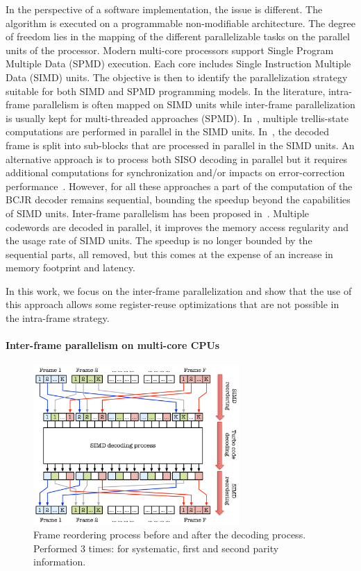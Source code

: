 In the perspective of a software implementation, the issue is different. The
algorithm is executed on a programmable non-modifiable architecture. The degree
of freedom lies in the mapping of the different parallelizable tasks on the
parallel units of the processor. Modern multi-core processors support Single
Program Multiple Data (SPMD) execution. Each core includes Single Instruction
Multiple Data (SIMD) units. The objective is then to identify the
parallelization strategy suitable for both SIMD and SPMD programming models.
In the literature, intra-frame parallelism is often mapped on SIMD units while
inter-frame parallelization is usually kept for multi-threaded approaches
(SPMD). In~\cite{Zhang2012,Wu2013}, multiple trellis-state computations are
performed in parallel in the SIMD units. In~\cite{Wu2010,Wu2011,Chinnici2012,
Yoge2012,Zhang2012,Liu2013,Chen2013,Xianjun2013,Wu2013,Zhang2014,Li2014}, the
decoded frame is split into sub-blocks that are processed in parallel in the
SIMD units. An alternative approach is to process both SISO decoding in parallel
but it requires additional computations for synchronization and/or impacts on
error-correction performance~\cite{Muller2009}. However, for all these
approaches a part of the computation of the BCJR decoder remains sequential,
bounding the speedup beyond the capabilities of SIMD units. Inter-frame
parallelism has been proposed in~\cite{Wu2010,Wu2011,Zhang2012,Wu2013}. Multiple
codewords are decoded in parallel, it improves the memory access regularity and
the usage rate of SIMD units. The speedup is no longer bounded by the sequential
parts, all removed, but this comes at the expense of an increase in memory
footprint and latency.

In this work, we focus on the inter-frame parallelization and show that the use
of this approach allows some register-reuse optimizations that are not possible
in the intra-frame strategy.

\paragraph{Inter-frame parallelism on multi-core CPUs}

\begin{figure}
  \centering
  \includegraphics[width=0.70\textwidth]{turbo/reordering_process_inter_simd}
  \caption{Frame reordering process before and after the decoding process.
    Performed 3 times: for systematic, first and second parity information.}
  \label{fig:turbo_reordering_process_inter_simd}
\end{figure}


